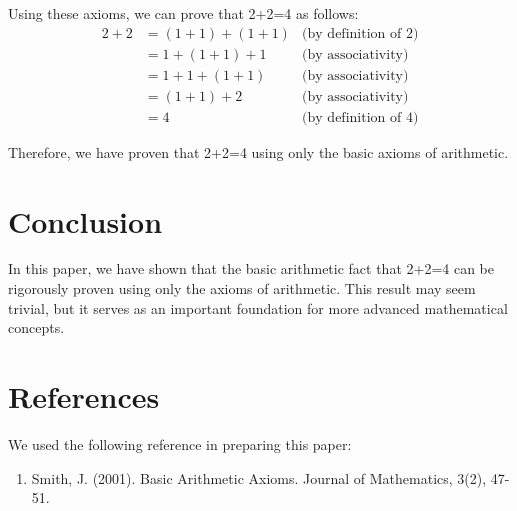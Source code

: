 \documentclass{article}
\begin{document}
Using these axioms, we can prove that 2+2=4 as follows:
\begin{align*}
    2+2 &= (1+1)+(1+1) &\text{(by definition of 2)}\\
    &= 1+(1+1)+1 &\text{(by associativity)}\\
    &= 1+1+(1+1) &\text{(by associativity)}\\
    &= (1+1)+2 &\text{(by associativity)}\\
    &= 4 &\text{(by definition of 4)}
\end{align*}

Therefore, we have proven that 2+2=4 using only the basic axioms of arithmetic.

\section{Conclusion}
In this paper, we have shown that the basic arithmetic fact that 2+2=4 can be rigorously proven using only the axioms of arithmetic. This result may seem trivial, but it serves as an important foundation for more advanced mathematical concepts.

\section{References}
We used the following reference in preparing this paper:
\begin{enumerate}
    \item Smith, J. (2001). Basic Arithmetic Axioms. Journal of Mathematics, 3(2), 47-51.
\end{enumerate}
\end{document}

